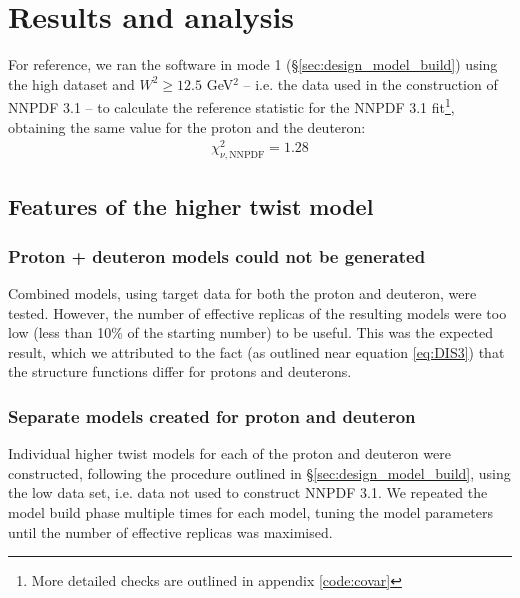 \documentclass[12pt,a4paper]{report}
\begin{document}
\chapter{Results and analysis} \label{ch:results}

For reference, we ran the software in mode 1 (\S \ref{sec:design_model_build}) using the high dataset and $W^2 \ge 12.5$ GeV$^2$ -- i.e. the data used in the construction of NNPDF 3.1 -- to calculate the reference statistic for the NNPDF 3.1 fit\footnote{More detailed checks are outlined in appendix \ref{code:covar}}, obtaining the same value for the proton and the deuteron:
\begin{align}
\label{eq:chisq_NNPDF} \chi_{\nu,\textrm{NNPDF}}^2 = 1.28
\end{align}

\section{Features of the higher twist model}

\subsection{Proton + deuteron models could not be generated} \label{sec_results_combined}

Combined models, using target data for both the proton and deuteron, were tested. However, the number of effective replicas of the resulting models were too low (less than 10\% of the starting number) to be useful. This was the expected result, which we attributed to the fact (as outlined near equation \ref{eq:DIS3}) that the structure functions differ for protons and deuterons.

\subsection{Separate models created for proton and deuteron} \label{sec_results_create}

Individual higher twist models for each of the proton and deuteron were constructed, following the procedure outlined in \S \ref{sec:design_model_build}, using the low data set, i.e. data not used to construct NNPDF 3.1. We repeated the model build phase multiple times for each model, tuning the model parameters until the number of effective replicas was maximised.
\end{document}

